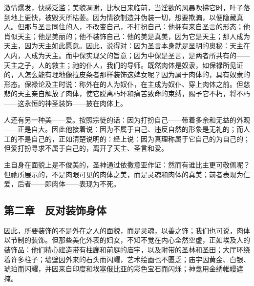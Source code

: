 \par

激情爆发，快感泛滥；美貌凋谢，比秋日来临前，当淫欲的风暴吹拂它时，叶子落到地上更快，被毁灭所枯萎。因为情欲制造并伪装一切，想要欺骗，以便隐藏真人。但那与圣言同住的人，不改变自己，不打扮自己：他拥有来自圣言的形态；他肖似天主；他是美丽的；他不装饰自己：他的美是真美，因为它是天主；那人成为天主，因为天主如此愿意。因此，说得对：因为圣言本身就是显明的奥秘：天主在人内，人成为天主。而中保实现父的旨意；因为中保是圣言，是两者所共有的——天主之子，人的救主；祂的仆人，我们的导师。既然肉体是奴隶，如保禄所见证的，人怎么能有理地像拉皮条者那样装饰这婢女呢？因为属于肉体的，具有奴隶的形态。保禄论及主时说：称外在的人为奴仆，在主成为奴仆、穿上肉体之前。但慈悲的天主亲自解放了肉体，使它脱离朽坏和痛苦致命的束缚，赐予它不朽，将不朽——这永恒的神圣装饰——披在肉体上。\par

人还有另一种美——爱。按照宗徒的话：因为打扮自己——带着多余和无益的外观——正是自大。因此他接着说：因为不属于自己、违反自然的形象是无礼的；而人工的不是自己的，正如清楚说明的：经上说：因为真理称属于它自己的为自己的；但爱打扮寻求不属于自己的，离开了天主、圣言和爱。\par

主自身在面貌上是不俊美的，圣神通过依撒意亚作证：然而有谁比主更可敬佩呢？但祂所展示的，不是肉眼可见的肉体之美，而是灵魂和肉体的真美；前者表现为仁爱，后者——即肉体——表现为不死。\par


\subsection{第二章　反对装饰身体}

因此，所要装饰的不是外在之人的面貌，而是灵魂，以善之饰；我们也可说，肉体以节制的装饰。但那些美化外表的妇女，不知不觉在内心全然空虚，正如埃及人的装饰品：他们精心建造带有柱廊和前庭的庙宇，以及附带的圣林和圣田；大厅环绕着许多柱子；墙壁因外来的石头而闪耀，艺术绘画也不匮乏；庙宇因黄金、白银、琥珀而闪耀，并因来自印度和埃塞俄比亚的彩色宝石而闪烁；神龛用金绣帷幔遮掩。\par

